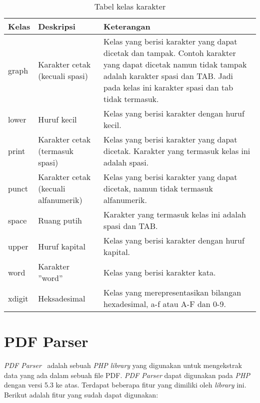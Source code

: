 \begin{table}[H]
	\caption {Tabel kelas karakter} \label{tab:character classes}
	\begin{center}
		\begin{tabular}{|p{2 cm}|>{\raggedright} p{5 cm}| p{7.5 cm}|}
		\hline
		Kelas & Deskripsi & Keterangan \\ 
		\hline 
		graph & Karakter cetak (kecuali spasi) & Kelas yang berisi karakter yang dapat dicetak dan tampak. Contoh karakter yang dapat dicetak namun tidak tampak adalah karakter spasi dan TAB. Jadi pada kelas ini karakter spasi dan tab tidak termasuk. \newline \\ 
		\hline 
		lower & Huruf kecil & Kelas yang berisi karakter dengan huruf kecil. \newline \\ 
		\hline 
		print & Karakter cetak (termasuk spasi) & Kelas yang berisi karakter yang dapat dicetak. Karakter yang termasuk kelas ini adalah spasi. \newline \\ 
		\hline 
		punct & Karakter cetak (kecuali alfanumerik) & Kelas yang berisi karakter yang dapat dicetak, namun tidak termasuk alfanumerik. \newline \\ 
		\hline 
		space & Ruang putih & Karakter yang termasuk kelas ini adalah spasi dan TAB. \newline \\ 
		\hline 
		upper & Huruf kapital & Kelas yang berisi karakter dengan huruf kapital. \newline \\ 
		\hline 
		word & Karakter ''word'' & Kelas yang berisi karakter kata. \newline \\ 
		\hline 
		xdigit & Heksadesimal & Kelas yang merepresentasikan bilangan hexadesimal, a-f atau A-F dan 0-9. \newline \\ 
		\hline 
		\end{tabular} 
	\end{center}
\end{table}

\section{PDF Parser}
\label{sec:pdfparser}

\textit{PDF Parser}~\cite{pdfparser} adalah sebuah \textit{PHP library} yang digunakan untuk mengekstrak data yang ada dalam sebuah file PDF. \textit{PDF Parser} dapat digunakan pada \textit{PHP} dengan versi 5.3 ke atas. Terdapat beberapa fitur yang dimiliki oleh \textit{library} ini. Berikut adalah fitur yang sudah dapat digunakan:

